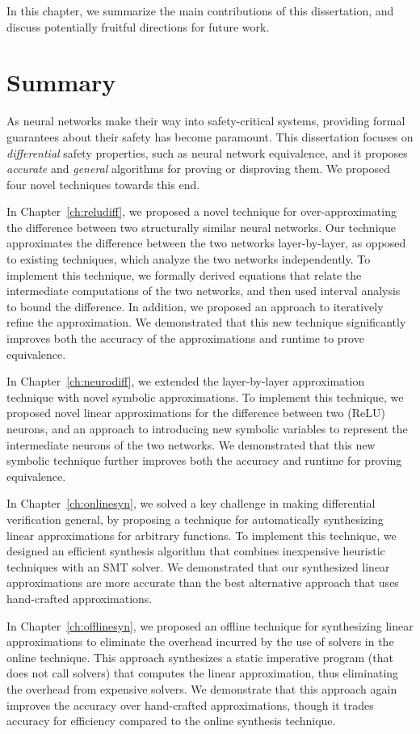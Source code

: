 In this chapter, we summarize the main contributions of this dissertation,
and discuss potentially fruitful directions for future work.

\section{Summary}
As neural networks make their way into safety-critical systems, providing
formal guarantees about their safety has become paramount. This
dissertation focuses on \textit{differential} safety properties, such as
neural network equivalence, and it proposes \textit{accurate} and
\textit{general} algorithms for proving or disproving them. We proposed
four novel techniques towards this end.

In Chapter~\ref{ch:reludiff}, we proposed a novel technique for
over-approximating the difference between two structurally similar neural
networks. Our technique approximates the difference between the two
networks layer-by-layer, as opposed to existing techniques, which analyze
the two networks independently. To implement this technique, we formally
derived equations that relate the intermediate computations of the two
networks, and then used interval analysis to bound the difference. In
addition, we proposed an approach to iteratively refine the approximation.
We demonstrated that this new technique significantly improves both the
accuracy of the approximations and runtime to prove equivalence.

In Chapter~\ref{ch:neurodiff}, we extended the layer-by-layer approximation
technique with novel symbolic approximations. To implement this technique,
we proposed novel linear approximations for the difference between two
(ReLU) neurons, and an approach to introducing new symbolic variables to
represent the intermediate neurons of the two networks. We demonstrated
that this new symbolic technique further improves both the accuracy and
runtime for proving equivalence.

In Chapter~\ref{ch:onlinesyn}, we solved a key challenge in making
differential verification general, by proposing a technique for
automatically synthesizing linear approximations for arbitrary functions.
To implement this technique, we designed an efficient synthesis algorithm
that combines inexpensive heuristic techniques with an SMT solver. We
demonstrated that our synthesized linear approximations are more accurate
than the best alternative approach that uses hand-crafted approximations.

In Chapter~\ref{ch:offlinesyn}, we proposed an offline technique for
synthesizing linear approximations to eliminate the overhead incurred by
the use of solvers in the online technique. This approach synthesizes a
static imperative program (that does not call solvers) that computes the
linear approximation, thus eliminating the overhead from expensive solvers.
We demonstrate that this approach again improves the accuracy over
hand-crafted approximations, though it trades accuracy for efficiency
compared to the online synthesis technique.

